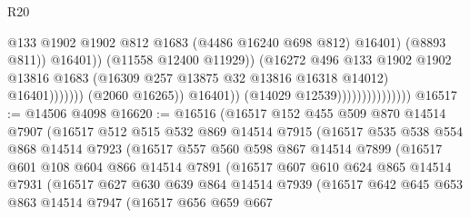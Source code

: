\begin{lexlean}{R20}
\begin{coremodule}
                                                            @133
                                                            @1902
                                                            @1902
                                                            @812
                                                            @1683
                                                            (@4486 @16240 @698 @812)
                                                            @16401)
                                                          (@8893 @811))
                                                        @16401))
                                                    (@11558 @12400 @11929))
                                                  (@16272
                                                    @496
                                                    @133
                                                    @1902
                                                    @1902
                                                    @13816
                                                    @1683
                                                    (@16309 @257 @13875 @32 @13816 @16318 @14012)
                                                    @16401)))))))
                                      (@2060 @16265))
                                    @16401))
                                (@14029 @12539)))))))))))))))
@16517 := @14506 @4098
@16620 := @16516
    (@16517
      @152
      @455
      @509
      @870
      @14514
      @7907
      (@16517
        @512
        @515
        @532
        @869
        @14514
        @7915
        (@16517
          @535
          @538
          @554
          @868
          @14514
          @7923
          (@16517
            @557
            @560
            @598
            @867
            @14514
            @7899
            (@16517
              @601
              @108
              @604
              @866
              @14514
              @7891
              (@16517
                @607
                @610
                @624
                @865
                @14514
                @7931
                (@16517
                  @627
                  @630
                  @639
                  @864
                  @14514
                  @7939
                  (@16517
                    @642
                    @645
                    @653
                    @863
                    @14514
                    @7947
                    (@16517
                      @656
                      @659
                      @667

\end{coremodule}
\end{lexlean}
